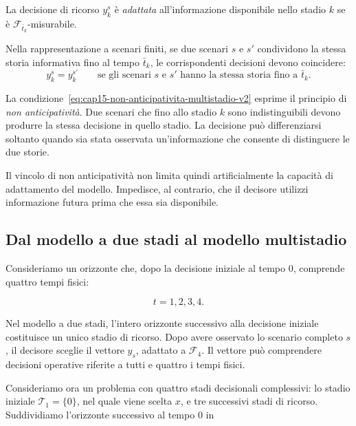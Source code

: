 \begin{definition}

\label{def:cap15-decisione-adattata-v2}

La decisione di ricorso $y_k^s$ \`e \emph{adattata} all'informazione
disponibile nello stadio $k$ se \`e
$\mathcal F_{\bar t_k}$-misurabile.

Nella rappresentazione a scenari finiti, se due scenari $s$ e $s'$
condividono la stessa storia informativa fino al tempo $\bar t_k$,
le corrispondenti decisioni devono coincidere:
\vspace{-0.5cm}
\begin{equation}
y_k^s=y_k^{s'}
\qquad
\text{se gli scenari }s\text{ e }s'
\text{ hanno la stessa storia fino a }\bar t_k.
\label{eq:cap15-non-anticipativita-multistadio-v2}
\end{equation}

\end{definition}
La condizione~\eqref{eq:cap15-non-anticipativita-multistadio-v2}
esprime il principio di \emph{non anticipativit\`a}.
Due scenari che fino allo stadio $k$ sono
indistinguibili devono produrre la stessa decisione in quello stadio. La
decisione pu\`o differenziarsi soltanto quando sia stata osservata
un'informazione che consente di distinguere le due storie.

Il vincolo di non anticipativit\`a non limita quindi artificialmente la
capacit\`a di adattamento del modello. Impedisce, al contrario, che il
decisore utilizzi informazione futura prima che essa sia disponibile.

\subsection{Dal modello a due stadi al modello multistadio}

Consideriamo un orizzonte che, dopo la decisione iniziale
al tempo $0$, comprende quattro tempi fisici:

\[
t=1,2,3,4.
\]

Nel modello a due stadi, l'intero orizzonte successivo
alla decisione iniziale costituisce un unico stadio
di ricorso. Dopo avere osservato lo scenario completo
$s$, il decisore sceglie il vettore $y_s$, adattato
a $\mathcal F_4$. Il vettore pu\`o comprendere
decisioni operative riferite a tutti e quattro
i tempi fisici.

Consideriamo ora un problema con quattro stadi
decisionali complessivi: lo stadio iniziale $\mathcal T_1=\{0\}$,
nel quale viene scelta $x$, e tre successivi
stadi di ricorso. Suddividiamo l'orizzonte
successivo al tempo $0$ in

